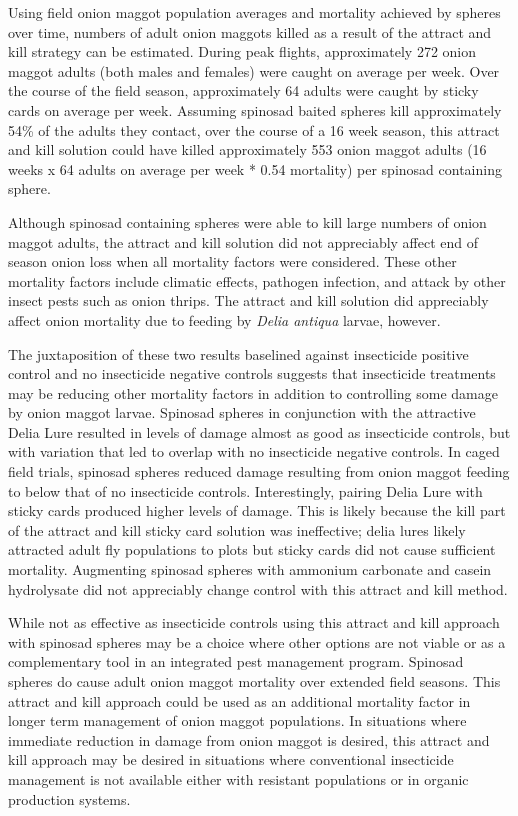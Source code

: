 \documentclass[alpha-refs]{wiley-article}
\begin{document}
Using field onion maggot population averages and mortality achieved by spheres over time, numbers of adult onion maggots killed as a result of the attract and kill strategy can be estimated. During peak flights, approximately 272 onion maggot adults (both males and females) were caught on average per week.  Over the course of the field season, approximately 64 adults were caught by sticky cards on average per week.  Assuming spinosad baited spheres kill approximately 54\% of the adults they contact, over the course of a 16 week season, this attract and kill solution could have killed approximately 553 onion maggot adults (16 weeks x 64 adults on average per week * 0.54 mortality) per spinosad containing sphere.  

Although spinosad containing spheres were able to kill large numbers of onion maggot adults, the attract and kill solution did not appreciably affect end of season onion loss when all mortality factors were considered.  These other mortality factors include climatic effects, pathogen infection, and attack by other insect pests such as onion thrips.  The attract and kill solution did appreciably affect onion mortality due to feeding by \textit{Delia antiqua} larvae, however.  

The juxtaposition of these two results baselined against insecticide positive control and no insecticide negative controls suggests that insecticide treatments may be reducing other mortality factors in addition to controlling some damage by onion maggot larvae.  Spinosad spheres in conjunction with the attractive Delia Lure resulted in levels of damage almost as good as insecticide controls, but with variation that led to overlap with no insecticide negative controls.  In caged field trials, spinosad spheres reduced damage resulting from onion maggot feeding to below that of no insecticide controls.  Interestingly, pairing Delia Lure with sticky cards produced higher levels of damage.  This is likely because the kill part of the attract and kill sticky card solution was ineffective; delia lures likely attracted adult fly populations to plots but sticky cards did not cause sufficient mortality.  Augmenting spinosad spheres with ammonium carbonate and casein hydrolysate did not appreciably change control with this attract and kill method.  

While not as effective as insecticide controls using this attract and kill approach with spinosad spheres may be a choice where other options are not viable or as a complementary tool in an integrated pest management program.  Spinosad spheres do cause adult onion maggot mortality over extended field seasons.  This attract and kill approach could be used as an additional mortality factor in longer term management of onion maggot populations.  In situations where immediate reduction in damage from onion maggot is desired, this attract and kill approach may be desired in situations where conventional insecticide management is not available either with resistant populations or in organic production systems.  
\end{document}
